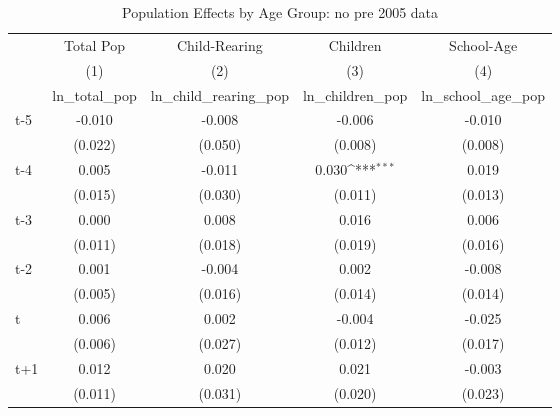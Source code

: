 \begin{table}[htbp]\centering
\def\sym#1{\ifmmode^{#1}\else\(^{#1}\)\fi}
\caption{Population Effects by Age Group: no pre 2005 data}
\begin{tabular}{l*{4}{c}}
\hline\hline
            &\multicolumn{1}{c}{Total Pop}&\multicolumn{1}{c}{Child-Rearing}&\multicolumn{1}{c}{Children}&\multicolumn{1}{c}{School-Age}\\\cmidrule(lr){2-2}\cmidrule(lr){3-3}\cmidrule(lr){4-4}\cmidrule(lr){5-5}
            &\multicolumn{1}{c}{(1)}&\multicolumn{1}{c}{(2)}&\multicolumn{1}{c}{(3)}&\multicolumn{1}{c}{(4)}\\
            &\multicolumn{1}{c}{ln\_total\_pop}&\multicolumn{1}{c}{ln\_child\_rearing\_pop}&\multicolumn{1}{c}{ln\_children\_pop}&\multicolumn{1}{c}{ln\_school\_age\_pop}\\
\hline
t-5         &      -0.010         &      -0.008         &      -0.006         &      -0.010         \\
            &     (0.022)         &     (0.050)         &     (0.008)         &     (0.008)         \\
[1em]
t-4         &       0.005         &      -0.011         &       0.030\sym{***}&       0.019         \\
            &     (0.015)         &     (0.030)         &     (0.011)         &     (0.013)         \\
[1em]
t-3         &       0.000         &       0.008         &       0.016         &       0.006         \\
            &     (0.011)         &     (0.018)         &     (0.019)         &     (0.016)         \\
[1em]
t-2         &       0.001         &      -0.004         &       0.002         &      -0.008         \\
            &     (0.005)         &     (0.016)         &     (0.014)         &     (0.014)         \\
[1em]
t           &       0.006         &       0.002         &      -0.004         &      -0.025         \\
            &     (0.006)         &     (0.027)         &     (0.012)         &     (0.017)         \\
[1em]
t+1         &       0.012         &       0.020         &       0.021         &      -0.003         \\
            &     (0.011)         &     (0.031)         &     (0.020)         &     (0.023)         \\

\end{tabular}
\end{table}
